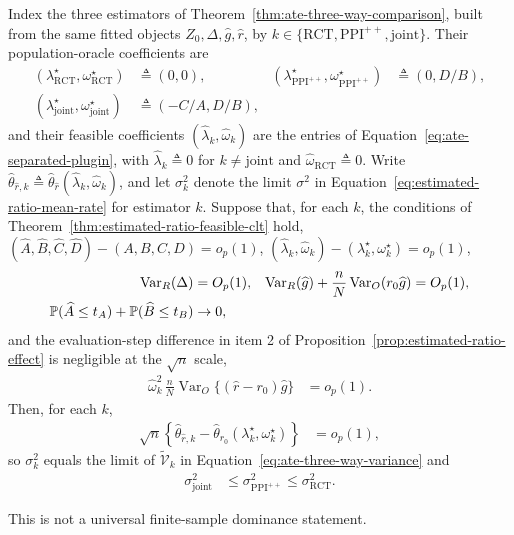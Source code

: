 \begin{theoremcorollary}
\label{cor:estimated-ratio-inheritance}
Index the three estimators of Theorem~\ref{thm:ate-three-way-comparison}, built from the same fitted objects $Z_0,\Delta,\widehat g,\widehat r$, by $k\in\{\mathrm{RCT},\mathrm{PPI}^{++},\mathrm{joint}\}$. Their population-oracle coefficients are
\begin{align*}
(\lambda^\star_{\mathrm{RCT}},\omega^\star_{\mathrm{RCT}})&\triangleq(0,0),
&
(\lambda^\star_{\mathrm{PPI}^{++}},\omega^\star_{\mathrm{PPI}^{++}})&\triangleq(0,D/B),
\\
(\lambda^\star_{\mathrm{joint}},\omega^\star_{\mathrm{joint}})&\triangleq(-C/A,D/B),
\end{align*}
and their feasible coefficients $(\widehat\lambda_k,\widehat\omega_k)$ are the entries of Equation~\eqref{eq:ate-separated-plugin}, with $\widehat\lambda_k\triangleq0$ for $k\neq\mathrm{joint}$ and $\widehat\omega_{\mathrm{RCT}}\triangleq0$. Write $\widehat\theta_{\widehat r,k}\triangleq\widehat\theta_{\widehat r}(\widehat\lambda_k,\widehat\omega_k)$, and let $\sigma_k^2$ denote the limit $\sigma^2$ in Equation~\eqref{eq:estimated-ratio-mean-rate} for estimator $k$. Suppose that, for each $k$, the conditions of Theorem~\ref{thm:estimated-ratio-feasible-clt} hold, $(\widehat A,\widehat B,\widehat C,\widehat D)-(A,B,C,D)=o_p(1)$, $(\widehat\lambda_k,\widehat\omega_k)-(\lambda_k^\star,\omega_k^\star)=o_p(1)$,
\begin{align}
\operatorname{Var}_R(\Delta)&=O_p(1),
&
\operatorname{Var}_R(\widehat g)+\frac nN\operatorname{Var}_O(r_0\widehat g)&=O_p(1),
\notag\\
\mathbb P(\widehat A\leq t_A)+\mathbb P(\widehat B\leq t_B)&\to0,
\label{eq:estimated-ratio-stability}
\end{align}
and the evaluation-step difference in item 2 of Proposition~\ref{prop:estimated-ratio-effect} is negligible at the $\sqrt n$ scale,
\begin{align}
\widehat\omega_k^2\,\frac nN\operatorname{Var}_O\{(\widehat r-r_0)\widehat g\}
&=o_p(1).
\label{eq:estimated-ratio-fluctuation-rate}
\end{align}
Then, for each $k$,
\begin{align}
\sqrt n\left\{\widehat\theta_{\widehat r,k}-\widehat\theta_{r_0}(\lambda_k^\star,\omega_k^\star)\right\}
&=o_p(1),
\label{eq:estimated-ratio-first-order-equivalence}
\end{align}
so $\sigma_k^2$ equals the limit of $\widetilde{\mathcal V}_k$ in Equation~\eqref{eq:ate-three-way-variance} and
\begin{align}
\sigma^2_{\mathrm{joint}}&\leq\sigma^2_{\mathrm{PPI}^{++}}\leq\sigma^2_{\mathrm{RCT}}.
\label{eq:estimated-ratio-inherited-ordering}
\end{align}
\end{theoremcorollary}
This is not a universal finite-sample dominance statement.
